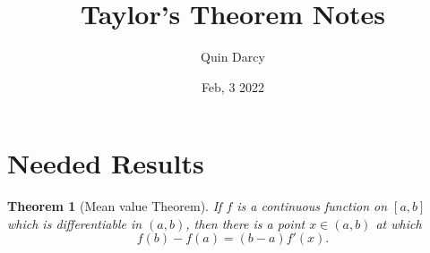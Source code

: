 \documentclass[12pt]{article}
\newtheorem{theorem}{Theorem}
\theoremstyle{definition}
\theoremstyle{definition}
\begin{document}
\title{Taylor's Theorem Notes}
\author{Quin Darcy}
\date{Feb, 3 2022}
\maketitle
\section{Needed Results}
    \begin{theorem}[Mean value Theorem]
        If $f$ is a continuous function on $[a, b]$ which is differentiable in
        $(a, b)$, then there is a point $x\in(a, b)$ at which 
        \begin{equation*}
            f(b)-f(a)=(b-a)f'(x).
        \end{equation*}
    \end{theorem}
\end{document}
